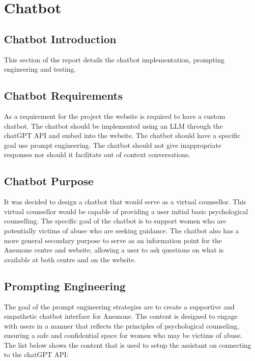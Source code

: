\section{Chatbot}
\subsection{Chatbot Introduction}

This section of the report details the chatbot implementation, prompting engineering and testing. 

\subsection{Chatbot Requirements}
As a requirement for the project the website is required to have a custom chatbot. 
The chatbot should be implemented using an LLM through the chatGPT API and embed into the website. 
The chatbot should have a specific goal use prompt engineering. 
The chatbot should not give inappropriate responses nor should it facilitate out of context conversations.

\subsection{Chatbot Purpose}
It was decided to design a chatbot that would serve as a virtual counsellor. 
This virtual counsellor would be capable of providing a user initial basic psychological counselling.
The specific goal of the chatbot is to support women who are potentially victims of abuse who are seeking guidance. 
The chatbot also has a more general secondary purpose to serve as an information point for the Anemone centre and website, 
allowing a user to ask questions on what is available at both centre and on the website. 

\subsection{Prompting Engineering}
The goal of the prompt engineering strategies are to create a supportive and empathetic chatbot interface for Anemone.
The content is designed to engage with users in a manner that reflects the principles of psychological counseling, ensuring a safe and confidential space for women who may be victims of abuse.
The list below shows the content that is used to setup the assistant on connecting to the chatGPT API:

